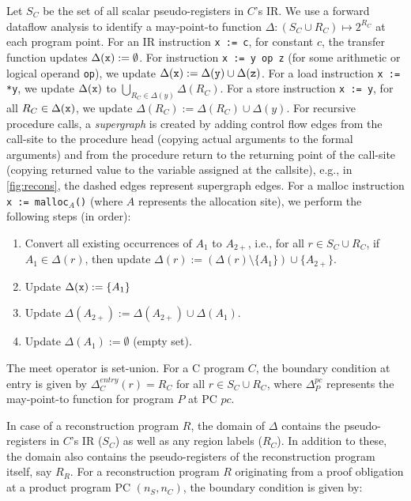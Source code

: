 Let $S_{C}$ be the set of all scalar pseudo-registers in $C$'s
IR. We use a forward dataflow
analysis to identify a may-point-to function $\Delta: (S_{C}\cup{}R_C) \mapsto 2^{R_C}$
at each program point.
For an IR instruction {\tt x := c}, for constant $c$, the
transfer function updates $\Delta({\tt x}) := \emptyset$.
For instruction {\tt x := y op z} (for some arithmetic
or logical operand {\tt op}),
we update $\Delta({\tt x}) := \Delta({\tt y})\cup\Delta({\tt z})$.
For a
load instruction {\tt x := *y}, we
update $\Delta({\tt x})$ to $\bigcup_{R_C\in\Delta(y)}\Delta(R_C)$.
For a store instruction {\tt *x := y}, for all
$R_C\in\Delta({\tt x})$, we update $\Delta(R_C) := \Delta(R_C)\cup\Delta(y)$.
For recursive procedure calls, a {\em supergraph}
is created by adding control flow edges
from the call-site to the procedure head (copying actual arguments
to the formal arguments) and from the procedure
return to the returning point of the call-site (copying returned
value to the variable assigned at the callsite), e.g., in
\cref{fig:recons}, the dashed edges
represent supergraph edges.
For a malloc instruction {\tt x := malloc$_A$()} (where $A$
represents the allocation site), we perform the following steps (in order):
\begin{enumerate}
\item Convert all existing occurrences of $A_1$ to $A_{2+}$, i.e., for all $r\in{}S_C\cup{}R_C$, if $A_1\in\Delta(r)$, then update $\Delta(r) := (\Delta(r)\setminus\{A_1\})\cup\{A_{2+}\}$.
\item Update $\Delta({\tt x}) := \{A_1\}$
\item Update $\Delta(A_{2+}) := \Delta(A_{2+})\cup\Delta(A_1)$.
\item Update $\Delta(A_1) := \emptyset$ (empty set).
\end{enumerate}

The meet operator is set-union.
For a C program $C$, the boundary condition at entry is given by
$\Delta_C^{entry}(r)=R_C$ for all $r\in{}S_C\cup{}R_C$,
where $\Delta_P^{pc}$ represents the may-point-to function
for program $P$ at PC $pc$.

In case of a reconstruction program $R$, the domain of $\Delta$ contains the pseudo-registers in $C$'s IR ($S_C$) as well as
any region labels ($R_C$). In addition to these, the domain also contains the pseudo-registers
of the reconstruction program itself, say $R_R$. For a reconstruction program $R$ originating from a proof obligation
at a product program PC $(n_S,n_C)$, the boundary condition is given by:

